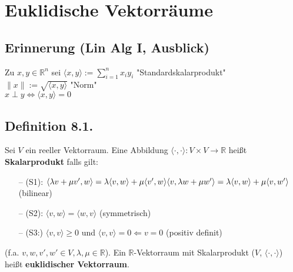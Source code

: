 \documentclass[a4paper, 12pt]{extarticle}
\newcommand{\skalar}[2] {
	\langle #1, #2\rangle
}
\newcommand{\genskalar}{
	\skalar{\cdot }{\cdot }
}
\begin{document}
\section{Euklidische Vektorräume}
\subsection*{Erinnerung (Lin Alg I, Ausblick)}
Zu $x, y \in \mathbb{R}^n$ sei ${\skalar{x}{y}} := \sum_{i=1}^{n}x_iy_i$ "Standardskalarprodukt"\\
$\parallel x\parallel := \sqrt{\skalar{x}{y}}$ "Norm"\\
$x \perp y \Leftrightarrow {\skalar{x}{y}} = 0$

\subsection*{Definition 8.1.}
Sei $V$ ein reeller Vektorraum. Eine Abbildung $\genskalar: V \times V \longrightarrow \mathbb{R}$ heißt \textbf{Skalarprodukt} falls gilt:
\begin{enumerate}
	\item [--] (S1): ${\skalar{\lambda v + \mu v'}{w}} = \lambda {\skalar{v}{w}} + \mu {\skalar{v'}{w}}\\
	{\skalar{v}{\lambda w + \mu w'}} = \lambda {\skalar{v}{w}} + \mu {\skalar{v}{w'}}$ (bilinear)
	\item [--] (S2): ${\skalar{v}{w}} = {\skalar{w}{v}}$ (symmetrisch)
	\item[--] (S3:) ${\skalar{v}{v}} \geq 0$ und ${\skalar{v}{v}} = 0 \Leftarrow v = 0$ (positiv definit)
\end{enumerate}

(f.a. $v, w, v', w' \in V, \lambda, \mu \in \mathbb{R}$).
Ein $\mathbb{R}$-Vektorraum mit Skalarprodukt ($V$, $\genskalar$) heißt \textbf{euklidischer Vektorraum}.
\end{document}
